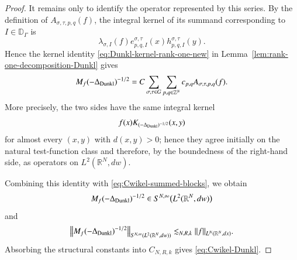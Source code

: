 \documentclass[12pt]{amsart}
\begin{document}
\begin{proof}
It remains only to identify the operator represented by this series.
By the definition of $A_{\sigma,\tau,p,q}(f)$, the integral kernel of
its summand corresponding to $I\in\mathbb D_\Gamma$ is
\[
\lambda_{\sigma,I}(f)
e_{p,q,I}^{\sigma,\tau}(x)
h_{p,q,I}^{\sigma,\tau}(y).
\]
Hence the kernel identity
\eqref{eq:Dunkl-kernel-rank-one-new} in
Lemma~\ref{lem:rank-one-decomposition-Dunkl} gives
\[
M_f(-\Delta_{{\rm Dunkl}})^{-1/2}
=
C
\sum_{\sigma,\tau\in G}
\sum_{p,q\in\mathbb Z^N}
c_{p,q}A_{\sigma,\tau,p,q}(f).
\]
More precisely, the two sides have the same integral kernel
\[
f(x)K_{(-\Delta_{{\rm Dunkl}})^{-1/2}}(x,y)
\]
for almost every $(x,y)$ with $d(x,y)>0$; hence they agree initially
on the natural test-function class and therefore, by the boundedness
of the right-hand side, as operators on $L^2(\mathbb R^N,dw)$.

Combining this identity with \eqref{eq:Cwikel-summed-blocks}, we obtain
\[
M_f(-\Delta_{{\rm Dunkl}})^{-1/2}
\in
S^{N,\infty}\bigl(L^2(\mathbb R^N,dw)\bigr)
\]
and
\[
\left\|
M_f(-\Delta_{{\rm Dunkl}})^{-1/2}
\right\|_
{S^{N,\infty}(L^2(\mathbb R^N,dw))}
\lesssim_{N,R,k}
\|f\|_{L^N(\mathbb R^N,dx)}.
\]
Absorbing the structural constants into $C_{N,R,k}$ gives
\eqref{eq:Cwikel-Dunkl}.
\end{proof}
\end{document}

